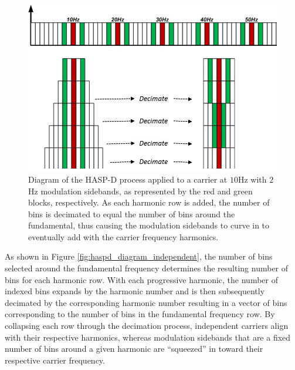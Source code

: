 \begin{figure}[tp]
	\includegraphics[width=\textwidth]{./misc_graphics/haspd_diagram_modulation.jpg}
	\centering
	\caption{Diagram of the HASP-D process applied to a carrier at $10$Hz with $2$Hz modulation sidebands, as represented by the red and green blocks, respectively.  As each harmonic row is added, the number of bins is decimated to equal the number of bins around the fundamental, thus causing the modulation sidebands to curve in to eventually add with the carrier frequency harmonics.}
	\label{fig:haspd_diagram_modulation}
\end{figure}

As shown in Figure \ref{fig:haspd_diagram_independent}, the number of bins selected around the fundamental frequency determines the resulting number of bins for each harmonic row.   With each progressive harmonic, the number of indexed bins expands by the harmonic number and is then subsequently decimated by the corresponding harmonic number resulting in a vector of bins corresponding to the number of bins in the fundamental frequency row.   By collapsing each row through the decimation process, independent carriers align with their respective harmonics, whereas modulation sidebands that are a fixed number of bins around a given harmonic are ``squeezed'' in toward their respective carrier frequency.   

